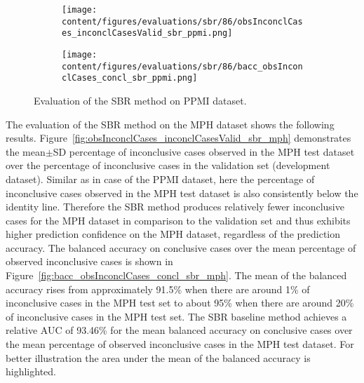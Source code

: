 \begin{figure}[ht]
  \begin{subfigure}{0.9\textwidth}
    \centering
    \texttt{[image: content/figures/evaluations/sbr/86/obsInconclCases\_inconclCasesValid\_sbr\_ppmi.png]}
    \label{fig:obsInconclCases_inconclCasesValid_sbr_ppmi}
  \end{subfigure}
  \hfill
  \begin{subfigure}{0.9\textwidth}
    \centering
    \texttt{[image: content/figures/evaluations/sbr/86/bacc\_obsInconclCases\_concl\_sbr\_ppmi.png]}
    \label{fig:bacc_obsInconclCases_concl_sbr_ppmi}
  \end{subfigure}
  \caption{Evaluation of the SBR method on PPMI dataset.}
  \label{fig:perf_results_sbr_ppmi}
\end{figure}




The evaluation of the SBR method on the MPH dataset shows the following results.
Figure~\ref{fig:obsInconclCases_inconclCasesValid_sbr_mph} demonstrates 
the mean$\pm$SD percentage of inconclusive cases observed in the MPH test dataset 
over the percentage of inconclusive cases in the validation set (development dataset).
Similar as in case of the PPMI dataset, here the percentage of inconclusive cases observed in the MPH test dataset
is also consistently below the identity line.
Therefore the SBR method produces relatively fewer inconclusive cases for the MPH dataset  
in comparison to the validation set and thus exhibits higher prediction confidence on the MPH dataset, 
regardless of the prediction accuracy.
The balanced accuracy on conclusive cases over the mean percentage of observed inconclusive cases is shown 
in Figure~\ref{fig:bacc_obsInconclCases_concl_sbr_mph}.
The mean of the balanced accuracy rises from approximately 91.5\% 
when there are around 1\% of inconclusive cases in the MPH test set to about 95\% 
when there are around 20\% of inconclusive cases in the MPH test set.
The SBR baseline method achieves a relative AUC of 93.46\% for the mean balanced accuracy on conclusive cases 
over the mean percentage of observed inconclusive cases in the MPH test dataset.
For better illustration the area under the mean of the balanced accuracy is highlighted.


